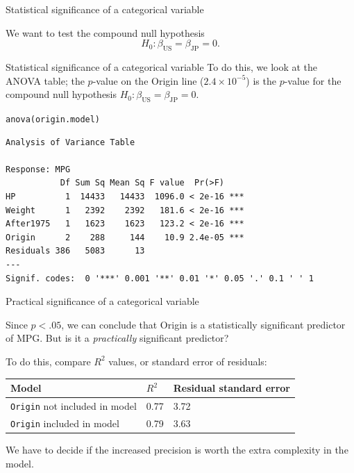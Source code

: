 \documentclass{beamer}\usepackage[]{graphicx}\usepackage[]{color}
\makeatletter
\newcommand{\hlstd}[1]{\textcolor[rgb]{1,0.894,0.769}{#1}}%
\newcommand{\hlkwd}[1]{\textcolor[rgb]{1,0.78,0.769}{#1}}%
\newenvironment{kframe}{%
 \def\at@end@of@kframe{}%
 \ifinner\ifhmode%
  \def\at@end@of@kframe{\end{minipage}}%
  \begin{minipage}{\columnwidth}%
 \fi\fi%
 \def\FrameCommand##1{\hskip\@totalleftmargin \hskip-\fboxsep
 \colorbox{shadecolor}{##1}\hskip-\fboxsep
     \hskip-\linewidth \hskip-\@totalleftmargin \hskip\columnwidth}%
 \MakeFramed {\advance\hsize-\width
   \@totalleftmargin\z@ \linewidth\hsize
   \@setminipage}}%
 {\par\unskip\endMakeFramed%
 \at@end@of@kframe}
\newenvironment{knitrout}{}{} %
\makeatother
\begin{document}
\begin{darkframes}
\begin{frame}[fragile]{Statistical significance of a categorical variable}
      \bigskip\pause

      We want to test the \alert{compound null hypothesis}
      \[
        H_0 : \beta_{\text{US}} = \beta_{\text{JP}} = 0.
      \]
    \end{frame}

    \begin{frame}[fragile]{Statistical significance of a categorical variable}
      To do this, we look at the ANOVA table; the $p$-value on the Origin line ($2.4 \times 10^{-5}$) is the $p$-value for the compound null hypothesis $H_0 : \beta_{\text{US}} = \beta_{\text{JP}} = 0$.
      \fontsm
\begin{knitrout}
\begin{kframe}
\begin{alltt}
\hlkwd{anova}\hlstd{(origin.model)}
\end{alltt}
\begin{verbatim}
Analysis of Variance Table

Response: MPG
           Df Sum Sq Mean Sq F value  Pr(>F)    
HP          1  14433   14433  1096.0 < 2e-16 ***
Weight      1   2392    2392   181.6 < 2e-16 ***
After1975   1   1623    1623   123.2 < 2e-16 ***
Origin      2    288     144    10.9 2.4e-05 ***
Residuals 386   5083      13                    
---
Signif. codes:  0 '***' 0.001 '**' 0.01 '*' 0.05 '.' 0.1 ' ' 1
\end{verbatim}
\end{kframe}
\end{knitrout}
    \end{frame}

    \begin{frame}{Practical significance of a categorical variable}
      
      Since $p<.05$, we can conclude that Origin is a statistically significant predictor of MPG.
      But is it a \emph{practically} significant predictor?

      \bigskip\pause

      To do this, compare $R^2$ values, or standard error of residuals:

      \bigskip

      \begin{tabular}{lll}
      \textbf{Model} & \textbf{$R^2$} & \textbf{Residual standard error} \\
      \hline
      \texttt{Origin} not included in model & 0.77 & 3.72 \\
      \texttt{Origin} included in model & 0.79 & 3.63 \\
      \hline
      \end{tabular}

      \bigskip

      We have to decide if the increased precision is worth the extra complexity in the model.
    \end{frame}
  \end{darkframes}
\end{document}
